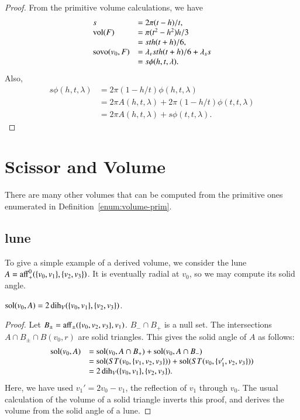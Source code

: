 \begin{proof}    From the primitive volume calculations,
we have 
  $$
  \begin{array}{lll}
  s &= 2\pi(t-h)/t,\\
  {\operatorname{vol}}(F) &= \pi(t^2-h^2)h/3\\
      &= s t h (t+h)/6,\\
  {\operatorname{sovo}}(v_0,F) &= 
     \lambda_v s t h (t+h)/6 + \lambda_s s\\
   &= s \phi(h,t,\lambda).
  \end{array}
  $$
Also,
  $$
  \begin{array}{lll}
  s\phi(h,t,\lambda) &= 2\pi (1-h/t)\phi(h,t,\lambda)\\
  &= 2\pi A(h,t,\lambda) + 2\pi (1-h/t)\phi(t,t,\lambda)\\
  &= 2\pi A(h,t,\lambda) + s \phi(t,t,\lambda).
  \end{array}
  $$
\end{proof}

\section{Scissor and Volume}

There are many other volumes that can be computed from the
primitive ones enumerated in Definition~\ref{enum:volume-prim}.

\subsection{lune}  

To give a simple example of a derived volume, we consider the
lune $A={\operatorname{aff}}_+^0(\{v_0,v_1\},\{v_2,v_3\})$.  It is eventually
radial at $v_0$, so we may compute its solid angle.

\begin{lemma}  $\operatorname{sol}(v_0,A) = 2\operatorname{dih}_V(\{v_0,v_1\},\{v_2,v_3\})$.
\end{lemma}

\begin{proof}
Let $B_{\pm} = {\operatorname{aff}}_\pm(\{v_0,v_2,v_3\},v_1)$.  $B_- \cap B_+$
is a null set.  The intersections $A\cap B_{\pm}\cap B(v_0,r)$ 
are solid triangles.  This gives the solid angle of $A$ as
follows:
   $$\begin{array}{lll}
   \operatorname{sol}(v_0,A) &= \operatorname{sol}(v_0,A\cap B_+)+\operatorname{sol}(v_0,A\cap B_-) \\
   &= 
   \operatorname{sol}(ST(v_0,\{v_1,v_2,v_3\})) + \operatorname{sol}(ST(v_0,\{v_1',v_2,v_3\})) \\
   &=
   2\operatorname{dih}_V(\{v_0,v_1\},\{v_2,v_3\}).
   \end{array}
   $$
Here, we have used $v_1'= 2 v_0 - v_1$, the reflection of $v_1$
through $v_0$.  The usual calculation of the volume of a solid triangle
inverts this proof, 
and derives the volume from the solid angle of a lune.
\end{proof}



